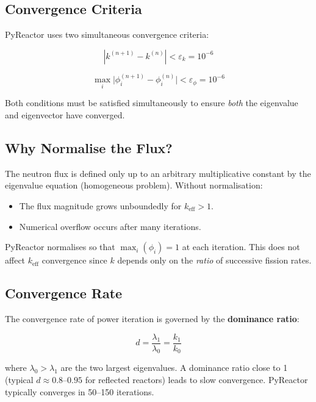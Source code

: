 \documentclass[12pt,a4paper]{article}
\newcommand{\keff}{k_{\mathrm{eff}}}
\begin{document}
\subsection{Convergence Criteria}

PyReactor uses two simultaneous convergence criteria:

\begin{equation}
  |k^{(n+1)} - k^{(n)}| < \varepsilon_k = 10^{-6}
  \label{eq:conv_k}
\end{equation}

\begin{equation}
  \max_i\bigl|\phi_i^{(n+1)} - \phi_i^{(n)}\bigr| < \varepsilon_\phi = 10^{-6}
  \label{eq:conv_phi}
\end{equation}

Both conditions must be satisfied simultaneously to ensure
\textit{both} the eigenvalue and eigenvector have converged.

\subsection{Why Normalise the Flux?}

The neutron flux is defined only up to an arbitrary multiplicative constant
by the eigenvalue equation (homogeneous problem). Without normalisation:
\begin{itemize}
  \item The flux magnitude grows unboundedly for $\keff > 1$.
  \item Numerical overflow occurs after many iterations.
\end{itemize}

PyReactor normalises so that $\max_i(\phi_i) = 1$ at each iteration.
This does not affect $\keff$ convergence since $k$ depends only on
the \textit{ratio} of successive fission rates.

\subsection{Convergence Rate}

The convergence rate of power iteration is governed by the
\textbf{dominance ratio}:

\begin{equation}
  d = \frac{\lambda_1}{\lambda_0} = \frac{k_1}{k_0}
\end{equation}

where $\lambda_0 > \lambda_1$ are the two largest eigenvalues.
A dominance ratio close to 1 (typical $d \approx 0.8$--$0.95$ for
reflected reactors) leads to slow convergence.
PyReactor typically converges in 50--150 iterations.
\end{document}
